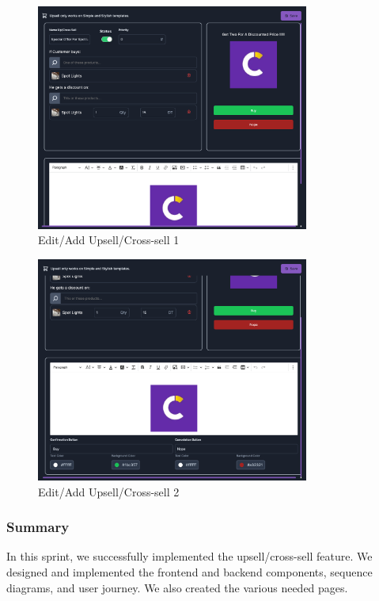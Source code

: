 \begin{itemize}
    \begin{figure}[H]
        \centering
        \includegraphics[width=0.8\textwidth]{images/editUpsell1.png}
        \caption{Edit/Add Upsell/Cross-sell 1}
        \label{fig:edit_upsell_one}
    \end{figure}
    \begin{figure}[H]
        \centering
        \includegraphics[width=0.8\textwidth]{images/editUpsell2.png}
        \caption{Edit/Add Upsell/Cross-sell 2}
        \label{fig:edit_upsell_two}
    \end{figure}
\end{itemize}

\subsubsection{Summary}

In this sprint, we successfully implemented the upsell/cross-sell feature. We designed and implemented the frontend and backend components, sequence diagrams, and user journey. We also created the various needed pages.

